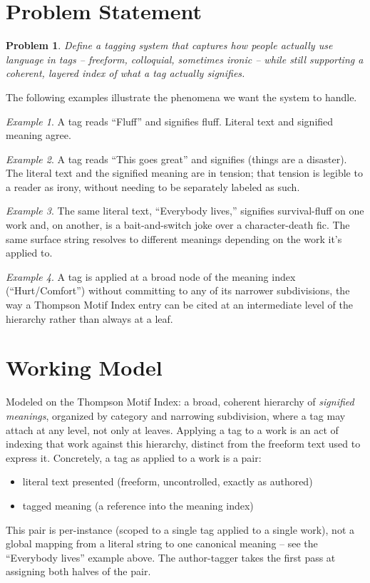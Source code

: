 \documentclass{amsart}
\newtheorem*{prob}{Problem}
\theoremstyle{remark}
\newtheorem{eg}{Example}
\begin{document}
    \section{Problem Statement}
    \begin{prob}
        Define a tagging system that captures how people actually use language in tags -- freeform, colloquial, sometimes ironic -- while still supporting a coherent, layered index of what a tag actually signifies.
    \end{prob}
    The following examples illustrate the phenomena we want the system to handle.
    \begin{eg}
        A tag reads ``Fluff'' and signifies fluff. Literal text and signified meaning agree.
    \end{eg}
    \begin{eg}
        A tag reads ``This goes great'' and signifies (things are a disaster). The literal text and the signified meaning are in tension; that tension is legible to a reader as irony, without needing to be separately labeled as such.
    \end{eg}
    \begin{eg}
        The same literal text, ``Everybody lives,'' signifies survival-fluff on one work and, on another, is a bait-and-switch joke over a character-death fic. The same surface string resolves to different meanings depending on the work it's applied to.
    \end{eg}
    \begin{eg}
        A tag is applied at a broad node of the meaning index (``Hurt/Comfort'') without committing to any of its narrower subdivisions, the way a Thompson Motif Index entry can be cited at an intermediate level of the hierarchy rather than always at a leaf.
    \end{eg}
    \section{Working Model}
    Modeled on the Thompson Motif Index: a broad, coherent hierarchy of \emph{signified meanings}, organized by category and narrowing subdivision, where a tag may attach at any level, not only at leaves.
    Applying a tag to a work is an act of indexing that work against this hierarchy, distinct from the freeform text used to express it. Concretely, a tag as applied to a work is a pair:
    \begin{itemize}
        \item literal text presented (freeform, uncontrolled, exactly as authored)
        \item tagged meaning (a reference into the meaning index)
    \end{itemize}
    This pair is per-instance (scoped to a single tag applied to a single work), not a global mapping from a literal string to one canonical meaning -- see the ``Everybody lives'' example above. The author-tagger takes the first pass at assigning both halves of the pair.
\end{document}
